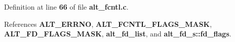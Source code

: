 Definition at line {\bf 66} of file {\bf alt\+\_\+fcntl.\+c}.



References {\bf A\+L\+T\+\_\+\+E\+R\+R\+NO}, {\bf A\+L\+T\+\_\+\+F\+C\+N\+T\+L\+\_\+\+F\+L\+A\+G\+S\+\_\+\+M\+A\+SK}, {\bf A\+L\+T\+\_\+\+F\+D\+\_\+\+F\+L\+A\+G\+S\+\_\+\+M\+A\+SK}, {\bf alt\+\_\+fd\+\_\+list}, and {\bf alt\+\_\+fd\+\_\+s\+::fd\+\_\+flags}.

